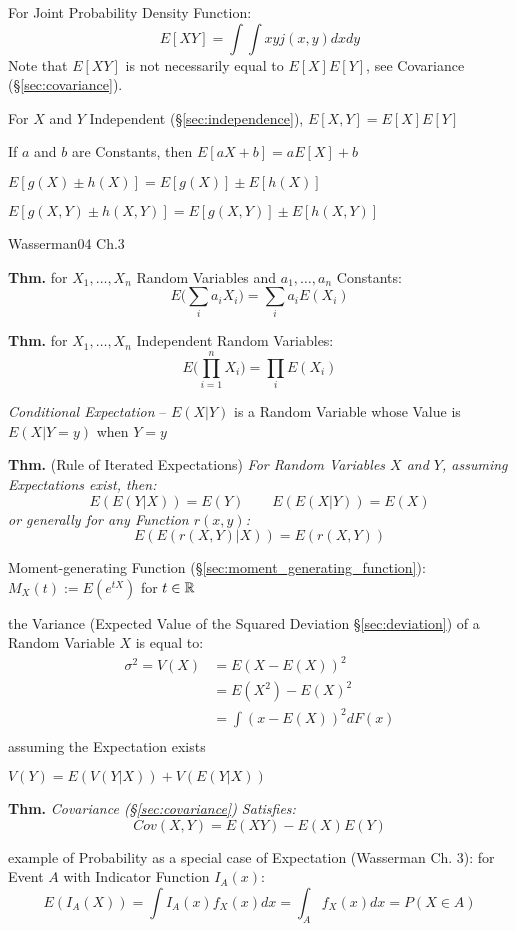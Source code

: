 For Joint Probability Density Function:
\[
  E[X Y] = \int\int x y j(x,y) dx dy
\]
\fist Note that $E[X Y]$ is not necessarily equal to $E[X] E[Y]$, see Covariance
(\S\ref{sec:covariance}).

For $X$ and $Y$ Independent (\S\ref{sec:independence}), $E[X,Y] = E[X] E[Y]$

If $a$ and $b$ are Constants, then $E[aX + b] = a E[X] + b$

$E [g(X) \pm h(X)] = E[g(X)] \pm E[h(X)]$

$E [g(X,Y) \pm h(X,Y)] = E[g(X,Y)] \pm E[h(X,Y)]$

Wasserman04 Ch.3

\textbf{Thm.} for $X_1, \ldots, X_n$ Random Variables and $a_1, \ldots, a_n$
Constants:
\[
  E\Big(\sum_i a_i X_i\Big) = \sum_i a_i E(X_i)
\]

\textbf{Thm.} for $X_1, \ldots, X_n$ Independent Random Variables:
\[
  E\Big(\prod_{i=1}^n X_i\Big) = \prod_i E(X_i)
\]

\emph{Conditional Expectation} -- $E(X|Y)$ is a Random Variable whose Value is
$E(X|Y = y)$ when $Y = y$

\textbf{Thm.} (Rule of Iterated Expectations) \emph{
  For Random Variables $X$ and $Y$, assuming Expectations exist, then:
  \[
    E(E(Y|X)) = E(Y) \quad\quad E(E(X|Y)) = E(X)
  \]
  or generally for any Function $r(x,y)$:
  \[
    E(E(r(X,Y)|X)) = E(r(X,Y))
  \]
}

Moment-generating Function (\S\ref{sec:moment_generating_function}):
$M_X(t) := E(e^{tX})$ for $t \in \mathbb{R}$

the Variance (Expected Value of the Squared Deviation \S\ref{sec:deviation}) of
a Random Variable $X$ is equal to:
\begin{align*}
  \sigma^2 = V(X) & = E(X - E(X))^2   \\
                  & = E(X^2) - E(X)^2 \\
                  & = \int(x - E(X))^2 dF(x) \\
\end{align*}
assuming the Expectation exists

$V(Y) = E(V(Y|X)) + V(E(Y|X))$

\textbf{Thm.} \emph{Covariance (\S\ref{sec:covariance}) Satisfies:
  \[
    Cov(X,Y) = E(XY) - E(X)E(Y)
  \]
}

example of Probability as a special case of Expectation (Wasserman Ch. 3): for
Event $A$ with Indicator Function $I_A(x)$:
\[
  E(I_A(X)) = \int I_A(x)f_X(x)dx = \int_A f_X(x) dx = P(X \in A)
\]

